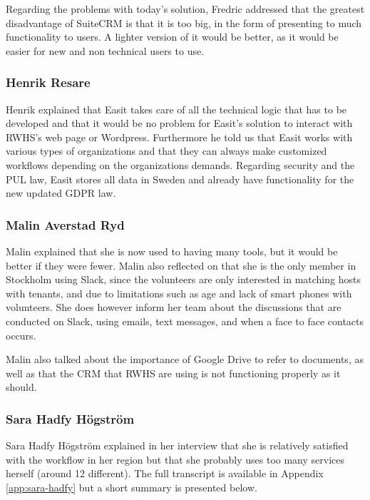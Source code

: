 Regarding the problems with today's solution, Fredric addressed that the greatest disadvantage of SuiteCRM is that it is too big, in the form of presenting to much functionality to users. A lighter version of it would be better, as it would be easier for new and non technical users to use. 

\subsubsection{Henrik Resare}

Henrik explained that Easit takes care of all the technical logic that has to be developed and that it would be no problem for Easit’s solution to interact with RWHS's web page or Wordpress. Furthermore he told us that Easit works with various types of organizations and that they can always make customized workflows depending on the organizations demands. Regarding security and the PUL law, Easit stores all data in Sweden and already have functionality for the new updated GDPR law. 

\subsubsection{Malin Averstad Ryd}
Malin explained that she is now used to having many tools, but it would be better if they were fewer. Malin also reflected on that she is the only member in Stockholm using Slack, since the volunteers are only interested in matching hosts with tenants, and due to limitations such as age and lack of smart phones with volunteers. She does however inform her team about the discussions that are conducted on Slack, using emails, text messages, and when a face to face contacts occurs.

Malin also talked about the importance of Google Drive to refer to documents, as well as that the CRM that RWHS are using is not functioning properly as it should.

\subsubsection{Sara Hadfy Högström}
Sara Hadfy Högström explained in her interview that she is relatively satisfied with the workflow in her region but that she probably uses too many services herself (around 12 different).  The full transcript is available in Appendix \ref{app:sara-hadfy} but a short summary is presented below.

